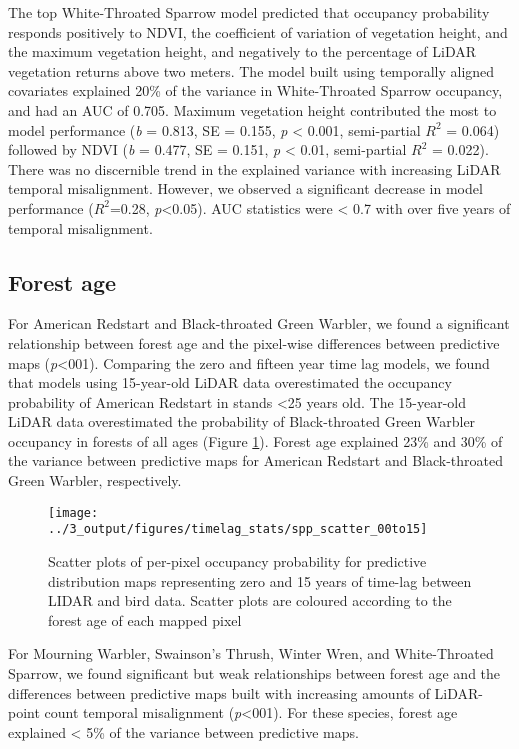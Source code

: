 \documentclass[
  12pt,
]{article}
\begin{document}
The top White-Throated Sparrow model predicted that occupancy probability responds positively to NDVI, the coefficient of variation of vegetation height, and the maximum vegetation height, and negatively to the percentage of LiDAR vegetation returns above two meters. The model built using temporally aligned covariates explained 20\% of the variance in White-Throated Sparrow occupancy, and had an AUC of 0.705. Maximum vegetation height contributed the most to model performance (\emph{b} = 0.813, SE = 0.155, \emph{p} \textless{} 0.001, semi-partial \(R^2\) = 0.064) followed by NDVI (\emph{b} = 0.477, SE = 0.151, \emph{p} \textless{} 0.01, semi-partial \(R^2\) = 0.022). There was no discernible trend in the explained variance with increasing LiDAR temporal misalignment. However, we observed a significant decrease in model performance (\(R^2\)=0.28, \emph{p}\textless0.05). AUC statistics were \textless{} 0.7 with over five years of temporal misalignment.

\hypertarget{forest-age}{%
\subsection{Forest age}\label{forest-age}}

For American Redstart and Black-throated Green Warbler, we found a significant relationship between forest age and the pixel-wise differences between predictive maps (\emph{p}\textless001). Comparing the zero and fifteen year time lag models, we found that models using 15-year-old LiDAR data overestimated the occupancy probability of American Redstart in stands \textless25 years old. The 15-year-old LiDAR data overestimated the probability of Black-throated Green Warbler occupancy in forests of all ages (Figure \ref{fig:2scatter}). Forest age explained 23\% and 30\% of the variance between predictive maps for American Redstart and Black-throated Green Warbler, respectively.

\begin{figure}[!ht]
\texttt{[image: ../3\_output/figures/timelag\_stats/spp\_scatter\_00to15]} \caption{Scatter plots of per-pixel occupancy probability for predictive distribution maps representing zero and 15 years of time-lag between LIDAR and bird data. Scatter plots are coloured according to the forest age of each mapped pixel}\label{fig:2scatter}
\end{figure}

For Mourning Warbler, Swainson's Thrush, Winter Wren, and White-Throated Sparrow, we found significant but weak relationships between forest age and the differences between predictive maps built with increasing amounts of LiDAR-point count temporal misalignment (\emph{p}\textless001). For these species, forest age explained \textless{} 5\% of the variance between predictive maps.
\end{document}
